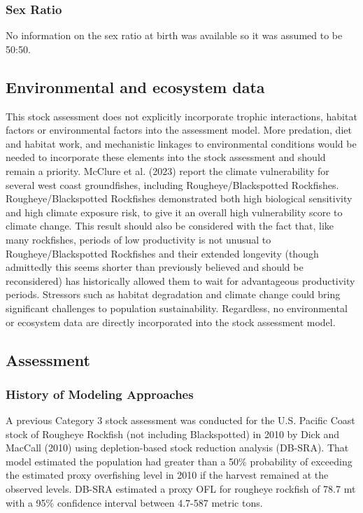 \documentclass[
]{scrartcl}
\begin{document}
\subsubsection{Sex Ratio}\label{sex-ratio}

No information on the sex ratio at birth was available so it was assumed
to be 50:50.

\subsection{Environmental and ecosystem
data}\label{environmental-and-ecosystem-data}

This stock assessment does not explicitly incorporate trophic
interactions, habitat factors or environmental factors into the
assessment model. More predation, diet and habitat work, and mechanistic
linkages to environmental conditions would be needed to incorporate
these elements into the stock assessment and should remain a priority.
McClure et al. (2023) report the climate vulnerability for several west
coast groundfishes, including Rougheye/Blackspotted Rockfishes.
Rougheye/Blackspotted Rockfishes demonstrated both high biological
sensitivity and high climate exposure risk, to give it an overall high
vulnerability score to climate change. This result should also be
considered with the fact that, like many rockfishes, periods of low
productivity is not unusual to Rougheye/Blackspotted Rockfishes and
their extended longevity (though admittedly this seems shorter than
previously believed and should be reconsidered) has historically allowed
them to wait for advantageous productivity periods. Stressors such as
habitat degradation and climate change could bring significant
challenges to population sustainability. Regardless, no environmental or
ecosystem data are directly incorporated into the stock assessment
model.

\newpage{}

\subsection{Assessment}\label{assessment}

\subsubsection{History of Modeling
Approaches}\label{history-of-modeling-approaches}

A previous Category 3 stock assessment was conducted for the U.S.
Pacific Coast stock of Rougheye Rockfish (not including Blackspotted) in
2010 by Dick and MacCall (2010) using depletion-based stock reduction
analysis (DB-SRA). That model estimated the population had greater than
a 50\% probability of exceeding the estimated proxy overfishing level in
2010 if the harvest remained at the observed levels. DB-SRA estimated a
proxy OFL for rougheye rockfish of 78.7 mt with a 95\% confidence
interval between 4.7-587 metric tons.
\end{document}
